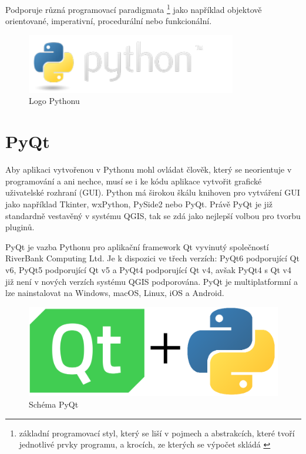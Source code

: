 Podporuje různá programovací paradigmata
\footnote{základní programovací styl, který se liší v pojmech a abstrakcích,
které tvoří jednotlivé prvky programu, a krocích, ze kterých se výpočet skládá \cite{wikipedia-paradigma}} 
jako například objektově orientované, imperativní, procedurální nebo funkcionální.

\begin{figure}[H] \centering
    \includegraphics[width=260pt]{./pictures/python-logo.png}
    \caption[Logo Pythonu]{Logo Pythonu \cite{python}}
	\label{fig:python-logo}                                
\end{figure} 

\section{PyQt}
Aby aplikaci vytvořenou v Pythonu mohl ovládat člověk, který se neorientuje v programování a ani nechce,
musí se i ke kódu aplikace vytvořit grafické uživatelské rozhraní (GUI). Python má širokou škálu knihoven
pro vytváření GUI jako například Tkinter, wxPython, PySide2 nebo PyQt. Právě PyQt je již standardně 
vestavěný v systému QGIS, tak se zdá jako nejlepší volbou pro tvorbu pluginů.  

PyQt je vazba Pythonu pro aplikační framework Qt vyvinutý společností RiverBank Computing Ltd.
Je k dispozici ve třech verzích: PyQt6 podporující Qt v6, PyQt5 podporující Qt v5 a PyQt4 podporující Qt v4,
avšak PyQt4 s Qt v4 již není v nových verzích systému QGIS podporována. PyQt je multiplatformní a lze nainstalovat na Windows,
macOS, Linux, iOS a Android. \cite{pyqt}

\begin{figure}[H] \centering
    \includegraphics[width=400pt]{./pictures/pyqt.png}
    \caption[Schéma PyQt Pythonu]{Schéma PyQt}
	\label{fig:pyqt}                                
\end{figure} 

